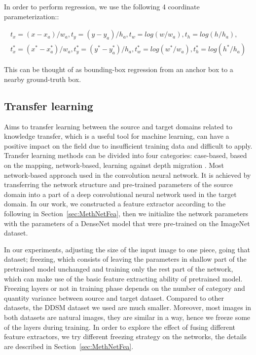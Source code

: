 In order to perform regression, we use the 
following 4 coordinate parameterization::

\begin{eqnarray}\label{eq:eq_descr_5}
    t_x=(x-x_a)/w_a, 
    t_y=(y-y_a)/h_a, 
    t_w=log(w/w_a), 
    t_h=log(h/h_a), \\
    t_x^*=(x^*-x^*_a)/w_a, 
    t_y^*=(y^*-y^*_a)/h_a, 
    t_w^*=log(w^*/w_a), 
    t_h^*=log(h^*/h_a)
\end{eqnarray}

This can be thought of as 
bounding-box regression from an anchor box 
to a nearby ground-truth box.

\subsection{Transfer learning}
\label{sec:MethTL}

Aims to transfer learning between the source 
and target domains related to knowledge 
transfer, which is a useful tool for machine 
learning, can have a positive impact on the 
field due to insufficient training data and 
difficult to apply.
Transfer learning methods can be divided into 
four categories: case-based, based on the 
mapping, network-based, learning against 
depth migration
\cite{Pan2010,Tan2018}.
Most network-based approach used in the 
convolution neural network.
It is achieved by transferring the network 
structure and pre-trained parameters of the 
source domain into a part of a deep 
convolutional neural network used in the 
target domain. 
In our work, we constructed a feature 
extractor according to the following in 
Section~\ref{sec:MethNetFea}, 
then we initialize the network parameters 
with the parameters of a DenseNet model 
that were pre-trained on the ImageNet dataset.

In our experiments, adjusting the size of 
the input image to one piece, going that 
dataset; 
freezing, which consists of leaving the 
parameters in shallow part of the 
pretrained model unchanged and training 
only the rest part of the network, which can 
make use of the basic feature extracting 
ability of pretrained model. Freezing layers 
or not in training phase depends on the 
number of category and quantity variance 
between source and target dataset. 
Compared to other datasets, the DDSM 
dataset we used are much smaller. 
Moreover, most images in both datasets 
are natural images, they are similar in 
a way, hence we freeze some of the layers 
during training. In order to explore the 
effect of fusing different feature extractors, 
we try different freezing strategy on the 
networks, the details are described in 
Section~\ref{sec:MethNetFea}. 

